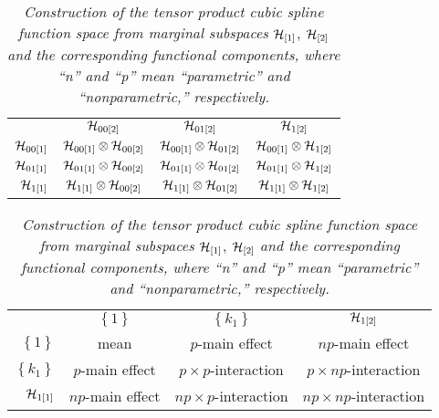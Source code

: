 \begin{table}[H]
\begin{center}%
\caption{\textit{Construction of the tensor product cubic spline function space from marginal subspaces} $\mathcal{H}_{\left[1\right]}$, $\mathcal{H}_{\left[2\right]}$ \textit{and the corresponding functional components, where ``n'' and ``p'' mean ``parametric'' and ``nonparametric,'' respectively.}} %
\label{table:tensor-product-cubic-spline-RKHS-table}
\begin{tabular}{r|c|c|c|} %
\multicolumn{1}{c}{} & \multicolumn{1}{c}{	$\mathcal{H}_{00\left[2\right]}$}	&	\multicolumn{1}{c}{$\mathcal{H}_{01\left[2\right]} $}	&\multicolumn{1}{c}{ $\mathcal{H}_{1\left[2\right]}$}\\ [1.5ex] 
\cline{2-4}  %
$\mathcal{H}_{00\left[1\right]} $		& $\mathcal{H}_{00\left[1\right]}\otimes \mathcal{H}_{00\left[2\right]}$ 	&	$\mathcal{H}_{00\left[1\right]}	\otimes \mathcal{H}_{01\left[2\right]} $	&	$\mathcal{H}_{00\left[1\right]}	\otimes \mathcal{H}_{1\left[2\right]}$   \\ [1.5ex] 
$\mathcal{H}_{01\left[1\right]}$		& $\mathcal{H}_{01\left[1\right]} \otimes \mathcal{H}_{00\left[2\right]}$			& 	$\mathcal{H}_{01\left[1\right]} \otimes \mathcal{H}_{01\left[2\right]}$   &   $\mathcal{H}_{01\left[1\right]} \otimes \mathcal{H}_{1\left[2\right]}$\\ [1.5ex] 
 $\mathcal{H}_{1\left[1\right]}$	& 	 $\mathcal{H}_{1\left[1\right]} \otimes \mathcal{H}_{00\left[2\right]}$	&	$\mathcal{H}_{1\left[1\right]} \otimes \mathcal{H}_{01\left[2\right]}$ 	&	$\mathcal{H}_{1\left[1\right]} \otimes \mathcal{H}_{1\left[2\right]}$ \\ [1.5ex] 
\cline{2-4}
\end{tabular}
\end{center}
\hfill
\hfill
\begin{center}
\begin{tabular}{r|c|c|c|} %
\multicolumn{1}{c}{} & \multicolumn{1}{c}{	$\left\{1\right\}$}	&	\multicolumn{1}{c}{$ \left\{k_1\right\}$}	&\multicolumn{1}{c}{ $\mathcal{H}_{1\left[2\right]}$}\\ [1.5ex] 
\cline{2-4}  %
$ \left\{1\right\}$		& mean	&	$p$-main effect	&	$np$-main effect  \\ [1.5ex] 
$ \left\{k_1\right\}$	& 	$p$-main effect	& 	$p\times p$-interaction   & $p \times np$-interaction  \\ [1.5ex] 
 $\mathcal{H}_{1\left[1\right]}$	& 	$np$-main effect 	&  $np\times p$-interaction	&	$np \times np$-interaction \\ [1.5ex] 
\cline{2-4}
\end{tabular}
\end{center}
\end{table}


